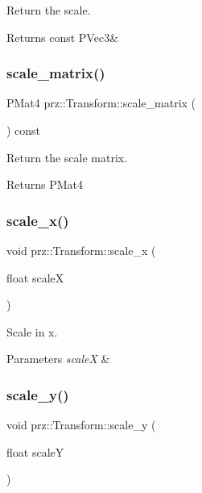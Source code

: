 Return the scale. 

\begin{DoxyReturn}{Returns}
const P\+Vec3\& 
\end{DoxyReturn}
\mbox{\label{classprz_1_1_transform_a0d906dd2cccb1207304c09cbeb9da99d}} 
\subsubsection{\texorpdfstring{scale\_matrix()}{scale\_matrix()}}
{\footnotesize\ttfamily P\+Mat4 prz\+::\+Transform\+::scale\+\_\+matrix (\begin{DoxyParamCaption}{ }\end{DoxyParamCaption}) const}



Return the scale matrix. 

\begin{DoxyReturn}{Returns}
P\+Mat4 
\end{DoxyReturn}
\mbox{\label{classprz_1_1_transform_a3954a22c651edb9d7ebd3fc02e819464}} 
\subsubsection{\texorpdfstring{scale\_x()}{scale\_x()}}
{\footnotesize\ttfamily void prz\+::\+Transform\+::scale\+\_\+x (\begin{DoxyParamCaption}\item[{float}]{scaleX }\end{DoxyParamCaption})}



Scale in x. 


\begin{DoxyParams}{Parameters}
{\em scaleX} & \\
\hline
\end{DoxyParams}
\mbox{\label{classprz_1_1_transform_a84fe3a084d8a95376502752bf23611d9}} 
\subsubsection{\texorpdfstring{scale\_y()}{scale\_y()}}
{\footnotesize\ttfamily void prz\+::\+Transform\+::scale\+\_\+y (\begin{DoxyParamCaption}\item[{float}]{scaleY }\end{DoxyParamCaption})}



